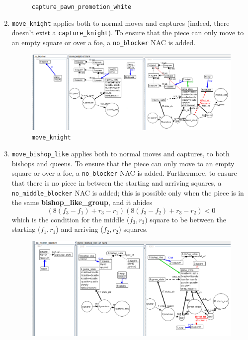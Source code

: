 \documentclass[a4paper, 10pt]{scrartcl}
\newcommand{\noderepr}[1]{\textsf{\textbf{#1}}}
\newcommand{\bishopgroupnode}{\noderepr{bishop\_like\_group}}
\begin{document}
\begin{enumerate}
\begin{figure}[H]
            \caption{\texttt{capture\_pawn\_promotion\_white}}
        \end{figure}
        \item \texttt{move\_knight} applies both to normal moves and captures (indeed, there doesn't exist a \texttt{capture\_knight}). To ensure that the piece can only move to an empty square or over a foe, a \texttt{no\_blocker} NAC is added.
        \begin{figure}[H]
            \centering
            \includegraphics[width=.8\linewidth]{images/move_knight.png}
            \caption{\texttt{move\_knight}}
        \end{figure}
        \item \texttt{move\_bishop\_like} applies both to normal moves and captures, to both bishops and queens. To ensure that the piece can only move to an empty square or over a foe, a \texttt{no\_blocker} NAC is added. Furthermore, to ensure that there is no piece in between the starting and arriving squares, a \texttt{no\_middle\_blocker} NAC is added; this is possible only when the piece is in the same \bishopgroupnode, and it abides
        \begin{equation}\label{eq:slidegroupcheck}
            (8(f_3-f_1)+r_3-r_1)(8(f_3-f_2)+r_3-r_2)<0
        \end{equation}
        which is the condition for the middle ($f_3, r_3$) square to be between the starting ($f_1, r_1$) and arriving ($f_2, r_2$) squares.
        \begin{figure}[H]
            \centering
            \includegraphics[width=.8\linewidth]{images/move_bishop_like.png}

\end{figure}
\end{enumerate}
\end{document}
